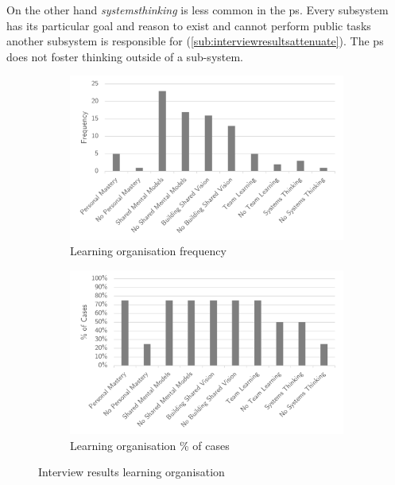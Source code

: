 On the other hand \textit{\gls{systemsthinking}} is less common in the \gls{ps}. Every subsystem has its particular goal and reason to exist and cannot perform public tasks another subsystem is responsible for (\cref{sub:interviewresultsattenuate}). The \gls{ps} does not foster thinking outside of a sub-system.
\begin{figure}[H]
	\centering
	\begin{subfigure}[H]{0.5\textwidth}
		\centering
		\includegraphics[width=0.95\linewidth]{images/learningorganisation_frequency}
		\caption{Learning organisation frequency}
		\label{fig:learningfrequency}
	\end{subfigure}%
	\begin{subfigure}[H]{0.5\textwidth}
		\centering
		\includegraphics[width=0.95\linewidth]{images/learningorganisation_cases}
		\caption{Learning organisation \% of cases}
		\label{fig:learningcases}
	\end{subfigure}
	\caption{Interview results learning organisation}
	\label{fig:interviewlearningorganisation}
\end{figure}

